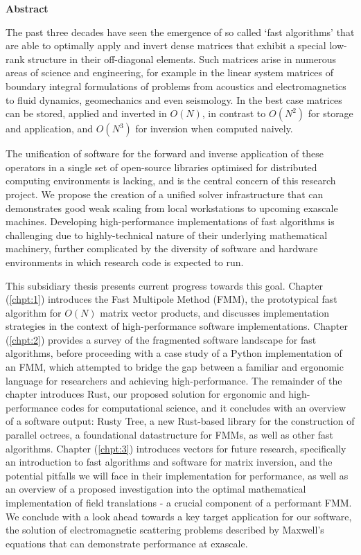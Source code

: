 \thispagestyle{plain}

\begin{center}
    \textbf{Abstract}
\end{center}

The past three decades have seen the emergence of so called `fast algorithms' that are able to optimally apply and invert dense matrices that exhibit a special low-rank structure in their off-diagonal elements. Such matrices arise in numerous areas of science and engineering, for example in the linear system matrices of boundary integral formulations of problems from acoustics and electromagnetics to fluid dynamics, geomechanics and even seismology. In the best case matrices can be stored, applied and inverted in $O(N)$, in contrast to $O(N^2)$ for storage and application, and $O(N^3)$ for inversion when computed naively.

The unification of software for the forward and inverse application of these operators in a single set of open-source libraries optimised for distributed computing environments is lacking, and is the central concern of this research project. We propose the creation of a unified solver infrastructure that can demonstrates good weak scaling from local workstations to upcoming exascale machines. Developing high-performance implementations of fast algorithms is challenging due to highly-technical nature of their underlying mathematical machinery, further complicated by the diversity of software and hardware environments in which research code is expected to run.

This subsidiary thesis presents current progress towards this goal. Chapter (\ref{chpt:1}) introduces the Fast Multipole Method (\gls{FMM}), the prototypical fast algorithm for $O(N)$ matrix vector products, and discusses implementation strategies in the context of high-performance software implementations. Chapter (\ref{chpt:2}) provides a survey of the fragmented software landscape for fast algorithms, before proceeding with a case study of a Python implementation of an FMM, which attempted to bridge the gap between a familiar and ergonomic language for researchers and achieving high-performance. The remainder of the chapter introduces Rust, our proposed solution for ergonomic and high-performance codes for computational science, and it concludes with an overview of a software output: Rusty Tree, a new Rust-based library for the construction of parallel octrees, a foundational datastructure for \gls{FMM}s, as well as other fast algorithms. Chapter (\ref{chpt:3}) introduces vectors for future research, specifically an introduction to fast algorithms and software for matrix inversion, and the potential pitfalls we will face in their implementation for performance, as well as an overview of a proposed investigation into the optimal mathematical implementation of field translations - a crucial component of a performant FMM. We conclude with a look ahead towards a key target application for our software, the solution of electromagnetic scattering problems described by Maxwell's equations that can demonstrate performance at exascale.

